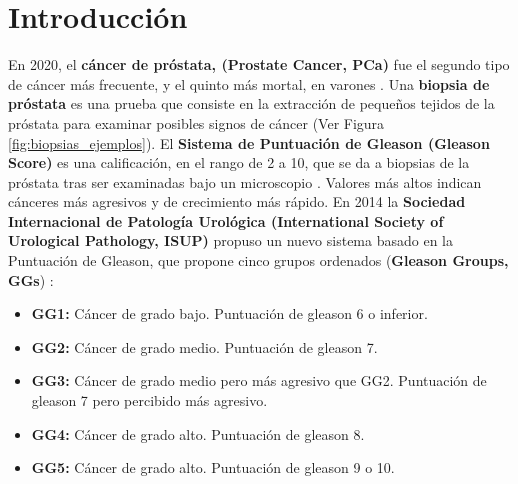 \newpage
\chapter{Introducción}

En 2020, el \textbf{cáncer de próstata, (Prostate Cancer, PCa)} fue el segundo tipo de cáncer más frecuente, y el quinto más mortal, en varones \cite{GlobalCancer}. Una \textbf{biopsia de próstata} es una prueba que consiste en la extracción de pequeños tejidos de la próstata para examinar posibles signos de cáncer (Ver Figura \ref{fig:biopsias_ejemplos}). El \textbf{Sistema de Puntuación de Gleason (Gleason Score)} es una calificación, en el rango de 2 a 10, que se da a biopsias de la próstata tras ser examinadas bajo un microscopio \cite{GleasonGov}. Valores más altos indican cánceres más agresivos y de crecimiento más rápido. En 2014 la \textbf{Sociedad Internacional de Patología Urológica (International Society of Urological Pathology, ISUP)} propuso un nuevo sistema basado en la Puntuación de Gleason, que propone cinco grupos ordenados (\textbf{Gleason Groups, GGs}) \cite{ISUP2014Disc}:
\begin{itemize}
\item \textbf{GG1: } Cáncer de grado bajo. Puntuación de gleason 6 o inferior.
\item \textbf{GG2: } Cáncer de grado medio. Puntuación de gleason 7.
\item \textbf{GG3: } Cáncer de grado medio pero más agresivo que GG2. Puntuación de gleason 7 pero percibido más agresivo.
\item \textbf{GG4: } Cáncer de grado alto. Puntuación de gleason 8.
\item \textbf{GG5: } Cáncer de grado alto. Puntuación de gleason 9 o 10.
\end{itemize}

